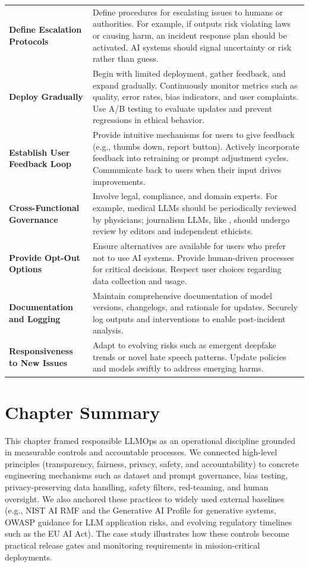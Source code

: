 {\begin{tabularx}{\linewidth}{@{}p{3.2cm}X@{}}
\textbf{Define Escalation Protocols} & Define procedures for escalating issues to humans or authorities. For example, if outputs risk violating laws or causing harm, an incident response plan should be activated. AI systems should signal uncertainty or risk rather than guess. \\
\textbf{Deploy Gradually} & Begin with limited deployment, gather feedback, and expand gradually. Continuously monitor metrics such as quality, error rates, bias indicators, and user complaints. Use A/B testing to evaluate updates and prevent regressions in ethical behavior. \\
\textbf{Establish User Feedback Loop} & Provide intuitive mechanisms for users to give feedback (e.g., thumbs down, report button). Actively incorporate feedback into retraining or prompt adjustment cycles. Communicate back to users when their input drives improvements. \\
\textbf{Cross-Functional Governance} & Involve legal, compliance, and domain experts. For example, medical LLMs should be periodically reviewed by physicians; journalism LLMs, like \ishtar{}, should undergo review by editors and independent ethicists. \\
\textbf{Provide Opt-Out Options} & Ensure alternatives are available for users who prefer not to use AI systems. Provide human-driven processes for critical decisions. Respect user choices regarding data collection and usage. \\
\textbf{Documentation and Logging} & Maintain comprehensive documentation of model versions, changelogs, and rationale for updates. Securely log outputs and interventions to enable post-incident analysis. \\
\textbf{Responsiveness to New Issues} & Adapt to evolving risks such as emergent deepfake trends or novel hate speech patterns. Update policies and models swiftly to address emerging harms. \\
\end{tabularx}
}

\section*{Chapter Summary}\label{sec:ethics-summary}
This chapter framed responsible LLMOps as an operational discipline grounded in measurable controls and accountable
processes. We connected high-level principles (transparency, fairness, privacy, safety, and accountability) to concrete
engineering mechanisms such as dataset and prompt governance, bias testing, privacy-preserving data handling, safety
filters, red-teaming, and human oversight. We also anchored these practices to widely used external baselines (e.g., NIST
AI RMF and the Generative AI Profile for generative systems, OWASP guidance for LLM application risks, and evolving
regulatory timelines such as the EU AI Act). The \ishtar{} case study illustrates how these controls become practical
release gates and monitoring requirements in mission-critical deployments.

